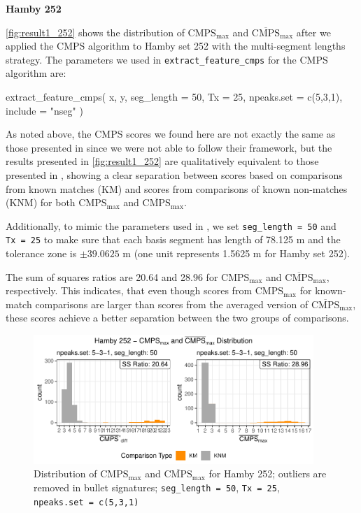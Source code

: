 \textbf{Hamby 252}

\autoref{fig:result1_252} shows the distribution of
\(\mathrm{CMPS_{max}}\) and \(\mathrm{\overline{CMPS}_{max}}\) after we
applied the CMPS algorithm to Hamby set 252 with the multi-segment
lengths strategy. The parameters we used in
\texttt{extract\_feature\_cmps} for the CMPS algorithm are:

\begin{Schunk}
\begin{Sinput}
extract_feature_cmps(
  x, y,
  seg_length = 50,
  Tx = 25,
  npeaks.set = c(5,3,1),
  include = "nseg"
)
\end{Sinput}
\end{Schunk}

As noted above, the CMPS scores we found here are not exactly the same
as those presented in \citet{cmps} since we were not able to follow
their framework, but the results presented in \autoref{fig:result1_252}
are qualitatively equivalent to those presented in \citet{cmps}, showing
a clear separation between scores based on comparisons from known
matches (KM) and scores from comparisons of known non-matches (KNM) for
both \(\mathrm{CMPS_{max}}\) and \(\mathrm{\overline{CMPS}_{max}}\).

Additionally, to mimic the parameters used in \citet{cmps}, we set
\texttt{seg\_length\ =\ 50} and \texttt{Tx\ =\ 25} to make sure that
each basis segment has length of 78.125 \textmu m and the tolerance zone
is \(\pm 39.0625\) \textmu m (one unit represents 1.5625 \textmu m for
Hamby set 252).

The sum of squares ratios are 20.64 and 28.96 for
\(\mathrm{CMPS_{max}}\) and \(\mathrm{\overline{CMPS}_{max}}\),
respectively. This indicates, that even though scores from
\(\mathrm{CMPS_{max}}\) for known-match comparisons are larger than
scores from the averaged version of \(\mathrm{\overline{CMPS}_{max}}\),
these scores achieve a better separation between the two groups of
comparisons.

\begin{Schunk}
\begin{figure}

{\centering \includegraphics[width=400px]{ju-hofmann_files/figure-latex/result1_252-1} 

}

\caption{Distribution of $\mathrm{CMPS_{max}}$ and $\mathrm{\overline{CMPS}_{max}}$ for Hamby 252; outliers are removed in bullet signatures; \texttt{seg\_length = 50}, \texttt{Tx = 25}, \texttt{npeaks.set = c(5,3,1)} }\label{fig:result1_252}
\end{figure}
\end{Schunk}

